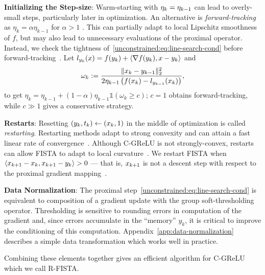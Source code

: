 \textbf{Initializing the Step-size}:
Warm-starting with \( \eta_k = \eta_{k-1} \) can lead to overly-small steps, particularly later in optimization.
An alternative is \emph{forward-tracking} as \( \eta_k = \alpha \eta_{k-1} \) for \( \alpha > 1 \) \citep{fridovich2019choosing}.
This can partially adapt to local Lipschitz smoothness of \( f \), but may also lead to unnecessary evaluations of the proximal operator.
Instead, we check the tightness of~\eqref{unconstrained:eq:line-search-cond} before forward-tracking~\citep{liu2009lassplore}.
Let \( l_{y_k}(x) = f(y_k) + \left\langle\nabla f(y_k), x - y_k\right\rangle \) and
\begin{equation}\label{unconstrained:eq:upper-bound-gap}
    \omega_k := \frac{\|x_k - y_{k-1}\|_2^2}{2 \eta_{k-1} \left(f(x_k) - l_{y_{k-1}}(x_k)\right)},
\end{equation}
to get \( \eta_{k} = \eta_{k-1} + (1 - \alpha) \eta_{k-1} \mathds{1}(\omega_k \geq c)\);
\( c = 1 \) obtains forward-tracking, while \( c \gg 1 \) gives a conservative strategy.

\textbf{Restarts}:
Resetting \( (y_k, t_k) \gets (x_k, 1) \) in the middle of optimization is called \emph{restarting}.
Restarting methods adapt to strong convexity and can attain a fast linear rate of convergence~\citep{nesterov2007proximalgradient, allen2014linear}.
Although C-GReLU is not strongly-convex, restarts can allow FISTA to adapt to local curvature~\citep{giselsson2014restart}.
We restart FISTA when
\( \left\langle x_{k+1} - x_k, x_{k+1} - y_k\right\rangle > 0 \) --- that is, \( x_{k+1} \) is not a descent step with respect to the proximal gradient mapping~\citep{odonoghue2015restarts}.

\textbf{Data Normalization}: The proximal step~\eqref{unconstrained:eq:line-search-cond} is equivalent to composition of a gradient update with the group soft-thresholding operator.
Thresholding is sensitive to rounding errors in computation of the gradient and,
since errors accumulate in the ``memory'' \( y_k \), it is critical to improve
the conditioning of this computation.
Appendix~\ref{app:data-normalization} describes a simple data transformation which works well in practice.

Combining these elements together gives an efficient algorithm for C-GReLU which we call R-FISTA.

